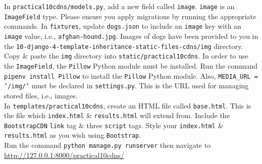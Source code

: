 \documentclass{article}
\begin{document}
In \texttt{practical10cdns/models.py}, add a new field called \texttt{image}. \texttt{image} is an \texttt{ImageField} type. Please ensure you apply migrations by running the appropriate commands. In \texttt{fixtures}, update \texttt{dogs.json} to include an \texttt{image} key with an \texttt{image} value, i.e., \texttt{afghan-hound.jpg}. Images of dogs have been provided to you in the \texttt{10-django-4-template-inheritance-static-files-cdns/img} directory. Copy \& paste the \texttt{img} directory into \texttt{static/practical10cdns}. In order to use the \texttt{ImageField}, the \texttt{Pillow} Python module must be installed. Run the command \texttt{pipenv install Pillow} to install the \texttt{Pillow} Python module. Also, \texttt{MEDIA\_URL = '/img/'} must be declared in \texttt{settings.py}. This is the URL used for managing stored files, i.e., images. \\

In \texttt{templates/practical10cdns}, create an HTML file called \texttt{base.html}. This is the file which \texttt{index.html} \& \texttt{results.html} will extend from. Include the \texttt{BootstrapCDN} \texttt{link} tag \& three \texttt{script} tags. Style your \texttt{index.html} \& \texttt{results.html} as you wish using \texttt{Bootstrap}. \\

Run the command \texttt{python manage.py runserver} then navigate to \href{http://127.0.0.1:8000/practical10cdns/}{http://127.0.0.1:8000/practical10cdns/} 
\end{document}
